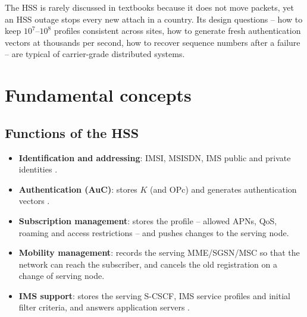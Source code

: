 \documentclass[11pt,a4paper]{article}
\begin{document}
The HSS is rarely discussed in textbooks because it does not move packets, yet an HSS outage stops
every new attach in a country. Its design questions -- how to keep $10^7$--$10^8$ profiles consistent
across sites, how to generate fresh authentication vectors at thousands per second, how to recover
sequence numbers after a failure -- are typical of carrier-grade distributed systems.

\section{Fundamental concepts}

\subsection{Functions of the HSS}
\begin{itemize}
  \item \textbf{Identification and addressing}: IMSI, MSISDN, IMS public and private identities
        \cite{ts23003}.
  \item \textbf{Authentication (AuC)}: stores $K$ (and OPc) and generates authentication vectors
        \cite{ts33102,ts33401}.
  \item \textbf{Subscription management}: stores the profile -- allowed APNs, QoS, roaming and access
        restrictions -- and pushes changes to the serving node.
  \item \textbf{Mobility management}: records the serving MME/SGSN/MSC so that the network can reach the
        subscriber, and cancels the old registration on a change of serving node.
  \item \textbf{IMS support}: stores the serving S-CSCF, IMS service profiles and initial filter
        criteria, and answers application servers \cite{ts23228}.
\end{itemize}
\end{document}
